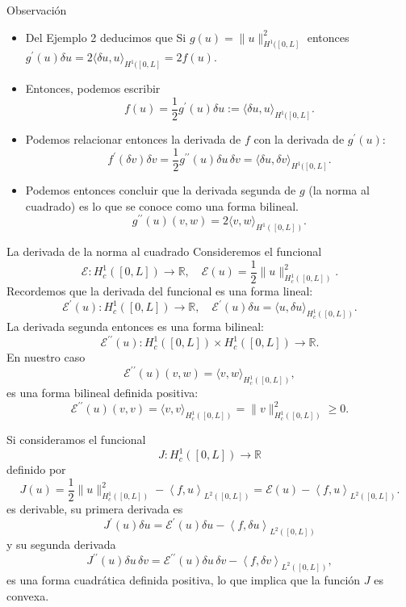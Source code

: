 \documentclass[10pt,handout]{beamer}
\theoremstyle{plain} %
\theoremstyle{plain} %
\theoremstyle{plain} %
\theoremstyle{plain} %
\theoremstyle{definition}
\theoremstyle{example}
\theoremstyle{example}
\theoremstyle{remark}
\theoremstyle{remark}
\begin{document}
    \begin{frame}{Observación}
   \begin{itemize} 
    \item Del Ejemplo 2 deducimos que Si $g(u)=\|u\|_{ H^1([0,L]}^2$ entonces $g^{\prime}(u)\delta u = 2 \langle \delta u, u\rangle_{ H^1([0,L]} = 2f(u).$
    \item Entonces, podemos escribir   $$f(u) = \frac{1}{2} g^{\prime}(u) \delta u:= \langle \delta u, u\rangle_{ H^1([0,L]}.$$ 
    \item Podemos relacionar entonces la derivada de $f$ con la derivada de $g^{\prime}(u):$   $$f^{\prime}(\delta v)\delta v = \frac{1}{2}g^{\prime \prime}(u)\delta u \, \delta v = \langle \delta u , \delta v \rangle_{ H^1([0,L]}.$$
    \item Podemos entonces concluir que la derivada segunda de $g$ (la norma al cuadrado) es lo que se conoce como una forma bilineal.
    $$
    g^{\prime \prime}(u)(v,w) =  2\langle v, w \rangle_{H^1([0,L])}.
    $$
   \end{itemize}
        \end{frame}
\begin{frame}{La derivada de la norma al cuadrado}
Consideremos el funcional
$$
\mathcal{E}:H_c^1([0,L]) \longrightarrow \mathbb{R},\quad \mathcal{E}(u) = \frac{1}{2} \|u\|_{H_c^1([0,L])}^2.
$$
Recordemos que la derivada del funcional es una forma lineal:
$$
\mathcal{E}^{\prime}(u):H_c^1([0,L]) \longrightarrow \mathbb{R},
\quad \mathcal{E}^{\prime}(u)\delta u = \langle u, \delta u \rangle_{H_c^1([0,L])}.
$$
La derivada segunda entonces es una forma bilineal:
$$
\mathcal{E}^{\prime \prime}(u):H_c^1([0,L]) \times H_c^1([0,L]) \longrightarrow \mathbb{R}.
$$
En nuestro caso
$$
\mathcal{E}^{\prime \prime}(u)(v,w) =  \langle v, w \rangle_{H^1_c([0,L])},
$$
es una forma bilineal definida positiva:
$$
\mathcal{E}^{\prime \prime}(u)(v,v) =  \langle v, v \rangle_{H^1_c([0,L])} = \|v\|_{H^1_c([0,L])}^2 \ge 0.
$$
\end{frame}

\begin{frame}
Si consideramos el funcional
$$
J:H_c^1([0,L]) \longrightarrow \mathbb{R}
$$
definido por
$$
J(u) = \frac{1}{2}  \|u\|_{H^1_c([0,L])}^2 - \left\langle f, u \right\rangle_{L^2([0,L])}
= \mathcal{E}(u) - \left\langle f, u \right\rangle_{L^2([0,L])}.
$$
es derivable, su primera derivada es
$$
J^{\prime}(u) \delta u = \mathcal{E}^{\prime}(u) \delta u - \left\langle f, \delta u \right\rangle_{L^2([0,L])}
$$
y su segunda derivada
$$
J^{\prime \prime }(u) \delta u \, \delta v= \mathcal{E}^{\prime \prime }(u) \delta u \, \delta v - \left\langle f, \delta v \right\rangle_{L^2([0,L])},
$$
es una forma cuadrática definida positiva, lo que implica que la función $J$ es convexa.
\end{frame}
\end{document}
